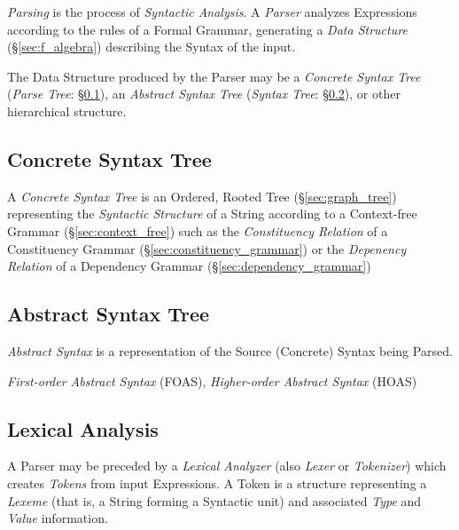 \emph{Parsing} is the process of \emph{Syntactic Analysis}. A
\emph{Parser} analyzes Expressions according to the rules of a Formal
Grammar, generating a \emph{Data Structure} (\S\ref{sec:f_algebra})
describing the Syntax of the input.

The Data Structure produced by the Parser may be a \emph{Concrete
  Syntax Tree} (\emph{Parse Tree}: \S\ref{sec:concrete_syntax}), an
\emph{Abstract Syntax Tree} (\emph{Syntax Tree}:
\S\ref{sec:abstract_syntax}), or other hierarchical structure.



\subsection{Concrete Syntax Tree}\label{sec:concrete_syntax}

A \emph{Concrete Syntax Tree} is an Ordered, Rooted Tree
(\S\ref{sec:graph_tree}) representing the \emph{Syntactic
  Structure} of a String according to a Context-free Grammar
(\S\ref{sec:context_free}) such as the \emph{Constituency Relation}
of a Constituency Grammar (\S\ref{sec:constituency_grammar}) or the
\emph{Depenency Relation} of a Dependency Grammar
(\S\ref{sec:dependency_grammar})



\subsection{Abstract Syntax Tree}\label{sec:abstract_syntax}

\emph{Abstract Syntax} is a representation of the Source (Concrete)
Syntax being Parsed.

\emph{First-order Abstract Syntax} (FOAS), \emph{Higher-order Abstract
  Syntax} (HOAS)



\subsection{Lexical Analysis}\label{sec:lexical_analysis}

A Parser may be preceded by a \emph{Lexical Analyzer} (also
\emph{Lexer} or \emph{Tokenizer}) which creates \emph{Tokens} from
input Expressions. A Token is a structure representing a \emph{Lexeme}
(that is, a String forming a Syntactic unit) and associated
\emph{Type} and \emph{Value} information.

